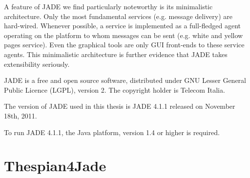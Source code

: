 A feature of JADE we find particularly noteworthy is its minimalistic architecture.
Only the most fundamental services (e.g. message delivery) are hard-wired.
Whenever possible, a service is implemented as a full-fledged agent operating on the platform to whom messages can be sent (e.g. white and yellow pages service).
Even the graphical tools are only GUI front-ends to these service agents.
This minimalistic architecture is further evidence that JADE takes extensibility seriously.

JADE is a free and open source software, distributed under GNU Lesser General Public Licence (LGPL), version 2.
The copyright holder is Telecom Italia.

The version of JADE used in this thesis is JADE 4.1.1 released on November 18th, 2011.

To run JADE 4.1.1, the Java platform, version 1.4 or higher is required.

\section{Thespian4Jade}